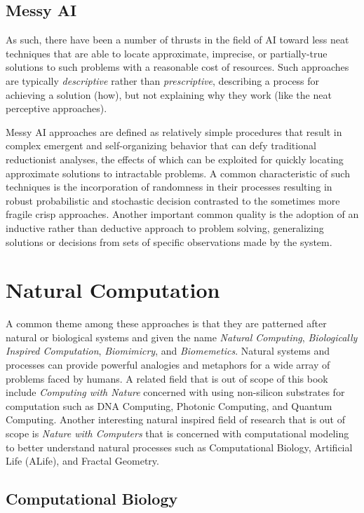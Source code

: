 \documentclass[a4paper, 11pt]{article}
\begin{document}
\subsection{Messy AI}
As such, there have been a number of thrusts in the field of AI toward less neat techniques that are able to locate approximate, imprecise, or partially-true solutions to such problems with a reasonable cost of resources. Such approaches are typically \emph{descriptive} rather than \emph{prescriptive}, describing a process for achieving a solution (how), but not explaining why they work (like the neat perceptive approaches). 

Messy AI approaches are defined as relatively simple procedures that result in complex emergent and self-organizing behavior that can defy traditional reductionist analyses, the effects of which can be exploited for quickly locating approximate solutions to intractable problems. A common characteristic of such techniques is the incorporation of randomness in their processes resulting in robust probabilistic and stochastic decision contrasted to the sometimes more fragile crisp approaches. Another important common quality is the adoption of an inductive rather than deductive approach to problem solving, generalizing solutions or decisions from sets of specific observations made by the system.


% 
% 
\section{Natural Computation}
A common theme among these approaches is that they are patterned after natural or biological systems and given the name \emph{Natural Computing}, \emph{Biologically Inspired Computation}, \emph{Biomimicry}, and \emph{Biomemetics}. Natural systems and processes can provide powerful analogies and metaphors for a wide array of problems faced by humans. A related field that is out of scope of this book include \emph{Computing with Nature} concerned with using non-silicon substrates for computation such as DNA Computing, Photonic Computing, and Quantum Computing. Another interesting natural inspired field of research that is out of scope is \textit{Nature with Computers} that is concerned with computational modeling to better understand natural processes such as Computational Biology, Artificial Life (ALife), and Fractal Geometry.



\subsection{Computational Biology}
\end{document}
